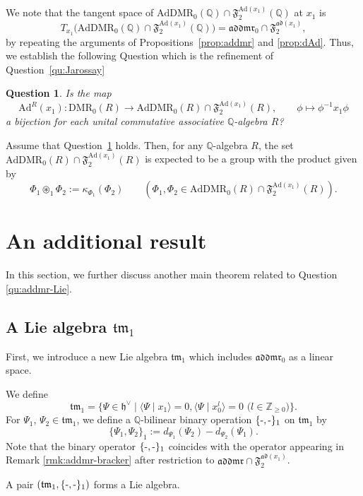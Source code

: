 \documentclass[15pt,oneside,reqno]{amsart}
\newtheorem{qu}[df]{Question}
\theoremstyle{remark}{
\newtheorem{lem}[df]{Lemma}
\newtheorem{prop}[df]{Proposition}
\newtheorem{ex}[df]{Example}
\newtheorem{rmk}[df]{Remark}
}
\newcommand{\ide}[1]{\mathfrak{#1}}
\newcommand{\Q}{\mathbb{Q}}
\newcommand{\DMR}{\mathrm{DMR}}
\newcommand{\AdDMR}{\mathrm{AdDMR}}
\newcommand{\addmr}{\mathfrak{addmr}}
\newcommand{\Ad}{\mathrm{Ad}}
\newcommand{\ad}{\mathfrak{ad}}
\newcommand{\tm}{\mathfrak{tm}}
\newcommand{\Fad}{\mathfrak{F}_2^{\ad(x_1)}}
\newcommand{\FAd}{\mathfrak{F}_2^{\Ad(x_1)}}
\begin{document}
We note that the tangent space of $\AdDMR_0(\Q)\cap \FAd(\Q)$ at $x_1$ is
\[
T_{x_1}\bigl(\AdDMR_0(\Q)\cap \FAd(\Q)\bigr)=\addmr_0 \cap \Fad,
\]
by repeating the arguments of Propositions~\ref{prop:addmr} and \ref{prop:dAd}.
Thus, we establish the following Question which is the refinement of Question~\ref{qu:Jarossay}

\begin{qu}\label{qu:AdDMR-grp}
Is the map
\[
\Ad^R(x_1)\colon \DMR_0(R) \longrightarrow \AdDMR_0(R)\cap \FAd(R),\qquad \phi \longmapsto \phi^{-1} x_1 \phi
\]
a bijection for each unital commutative associative $\Q$-algebra $R$?
\end{qu}
\begin{rmk}
Assume that Question~\ref{qu:AdDMR-grp} holds. Then, for any $\Q$-algebra $R$, the set
$\AdDMR_0(R)\cap\FAd(R)$ is expected to be a group with the product given by
\[
\Phi_1 \circledast_1 \Phi_2 := \kappa_{\Phi_1}(\Phi_2)
\qquad(\Phi_1,\Phi_2\in \AdDMR_0(R)\cap\FAd(R)).
\]
\end{rmk}

\section{An additional result}

In this section, we further discuss another main theorem related to Question \ref{qu:addmr-Lie}.

\subsection{A Lie algebra $\tm_1$}

First, we introduce a new Lie algebra $\tm_1$ which includes $\addmr_0$ as a linear space.

We define
\[
\tm_1= \{\Psi \in  \ide{h}^{\vee} \mid \langle \Psi \mid x_1 \rangle = 0,  \langle \Psi \mid x_0^l \rangle = 0 \text{ ($l\in\mathbb{Z}_{\ge 0}$)}\}.
\]
For $\Psi_1$, $\Psi_2 \in \tm_1$, we define a $\Q$-bilinear binary operation $\{\mathchar`-,\mathchar`-\}_1$ \cite[Appendix A.1.2]{Jarossay2020} on $\tm_1$ by
\[
\{\Psi_1,\Psi_2\}_{1} := d_{\Psi_1}(\Psi_2) - d_{\Psi_2}(\Psi_1).
\]
Note that the binary operator $\{\mathchar`-,\mathchar`-\}_1$ coincides with the operator appearing in Remark \ref{rmk:addmr-bracker} after restriction to $\addmr \cap \Fad$.


\begin{prop}\label{prop:tm1}
A pair $(\tm_1,\{\mathchar`-,\mathchar`-\}_1)$ forms a Lie algebra.
\end{prop}
\end{document}
